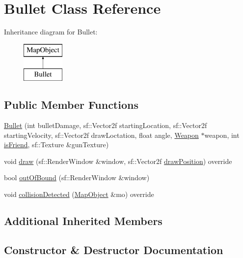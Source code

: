 \hypertarget{class_bullet}{}\section{Bullet Class Reference}
\label{class_bullet}
Inheritance diagram for Bullet\+:\begin{figure}[H]
\begin{center}
\leavevmode
\includegraphics[height=2.000000cm]{class_bullet}
\end{center}
\end{figure}
\subsection*{Public Member Functions}
\begin{DoxyCompactItemize}
\item 
\hyperlink{class_bullet_a8d7b8700db2094c9dfbae2dba10f7757}{Bullet} (int bullet\+Damage, sf\+::\+Vector2f starting\+Location, sf\+::\+Vector2f starting\+Velocity, sf\+::\+Vector2f draw\+Loctation, float angle, \hyperlink{class_weapon}{Weapon} $\ast$weapon, int \hyperlink{class_map_object_ab2c08c54979e8457057f4d2dcdaae0fb}{is\+Friend}, sf\+::\+Texture \&gun\+Texture)
\item 
void \hyperlink{class_bullet_a8bc85503a787fdf10896b595d4ef7c27}{draw} (sf\+::\+Render\+Window \&window, sf\+::\+Vector2f \hyperlink{class_map_object_a3f383fa967b67989a1d30f8f9ff73936}{draw\+Position}) override
\item 
bool \hyperlink{class_bullet_ab634595581e7f0d91302ff060775b87a}{out\+Of\+Bound} (sf\+::\+Render\+Window \&window)
\item 
void \hyperlink{class_bullet_a96602619e212539b0b9b2ac4b159dc30}{collision\+Detected} (\hyperlink{class_map_object}{Map\+Object} \&mo) override
\end{DoxyCompactItemize}
\subsection*{Additional Inherited Members}


\subsection{Constructor \& Destructor Documentation}
\hypertarget{class_bullet_a8d7b8700db2094c9dfbae2dba10f7757}{}

